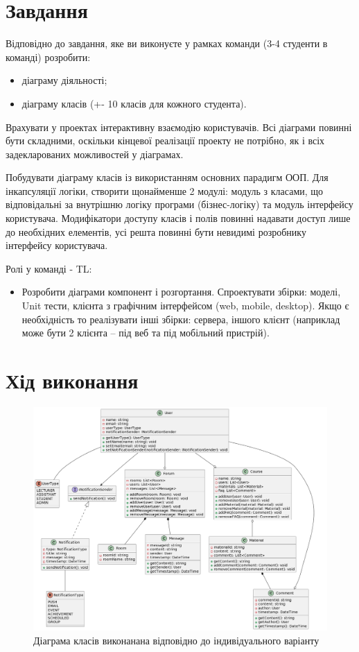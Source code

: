 \documentclass[oneside,14pt]{extarticle}
\begin{document}
\begin{normalsize}
	\section*{Завдання}
Відповідно до завдання, яке ви виконуєте у рамках команди (3-4 студенти в команді)
розробити:
\begin{itemize}
	\item діаграму діяльності;
	\item діаграму класів (+- 10 класів для кожного студента).
\end{itemize}

Врахувати у проектах інтерактивну взаємодію користувачів. Всі діаграми повинні бути
складними, оскільки кінцевої реалізації проекту не потрібно, як і всіх задекларованих
можливостей у діаграмах.

Побудувати діаграму класів із використанням основних парадигм ООП. Для інкапсуляції
логіки, створити щонайменше 2 модулі: модуль з класами, що відповідальні за внутрішню
логіку програми (бізнес-логіку) та модуль інтерфейсу користувача. Модифікатори доступу
класів і полів повинні надавати доступ лише до необхідних елементів, усі решта повинні бути
невидимі розробнику інтерфейсу користувача.

Ролі у команді - TL:
\begin{itemize}
	\item Розробити діаграми компонент і розгортання. Спроектувати збірки: моделі,
	Unit тести, клієнта з графічним інтерфейсом (web, mobile, desktop). Якщо є
	необхідність то реалізувати інші збірки: сервера, іншого клієнт (наприклад
	може бути 2 клієнта – під веб та під мобільний пристрій).
\end{itemize}
	\section*{Хід виконання}
	\begin{figure}[H]
		\centering
		\includegraphics[width=\textwidth]{class}
		\caption{Діаграма класів виконанана відповідно до індивідуального варіанту}
	\end{figure}
	

\end{normalsize}
\end{document}
